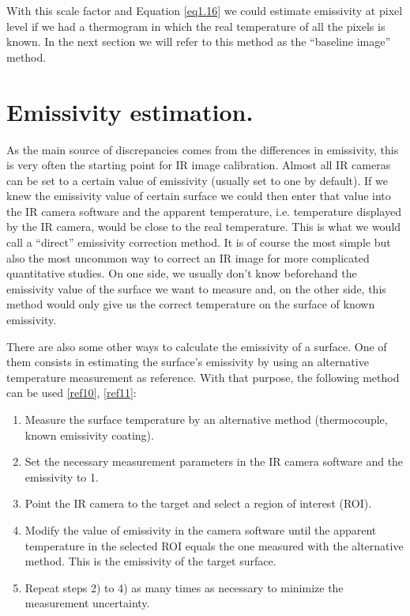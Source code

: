 		With this scale factor and Equation \ref{eq1.16} we could estimate emissivity at pixel level if we had a thermogram in which the real temperature of all the pixels is known. In the next section we will refer to this method as the “baseline image” method.\bigskip
		
	\section{Emissivity estimation. }\label{section3.3}
		
		As the main source of discrepancies comes from the differences in emissivity, this is very often the starting point for IR image calibration. Almost all IR cameras can be set to a certain value of emissivity (usually set to one by default). If we knew the emissivity value of certain surface we could then enter that value into the IR camera software and the apparent temperature, i.e. temperature displayed by the IR camera, would be close to the real temperature. This is what we would call a “direct” emissivity correction method. It is of course the most simple but also the most uncommon way to correct an IR image for more complicated quantitative studies. On one side, we usually don’t know beforehand the emissivity value of the surface we want to measure and, on the other side, this method would only give us the correct temperature on the surface of known emissivity.
		
		There are also some other ways to calculate the emissivity of a surface. One of them consists in estimating the surface’s emissivity by using an alternative temperature measurement as reference. With that purpose, the following method can be used  \ref{ref10}, \ref{ref11}:
		
		\begin{enumerate}[label={\arabic*)}]
			\item Measure the surface temperature by an alternative method (thermocouple, known emissivity coating).
			\item Set the necessary measurement parameters in the IR camera software and the emissivity to 1.
			\item Point the IR camera to the target and select a region of interest (ROI).
			\item Modify the value of emissivity in the camera software until the apparent temperature in the selected ROI equals the one measured with the alternative method. This is the emissivity of the target surface.
			\item Repeat steps 2) to 4) as many times as necessary to minimize the measurement uncertainty.
		\end{enumerate}
	
